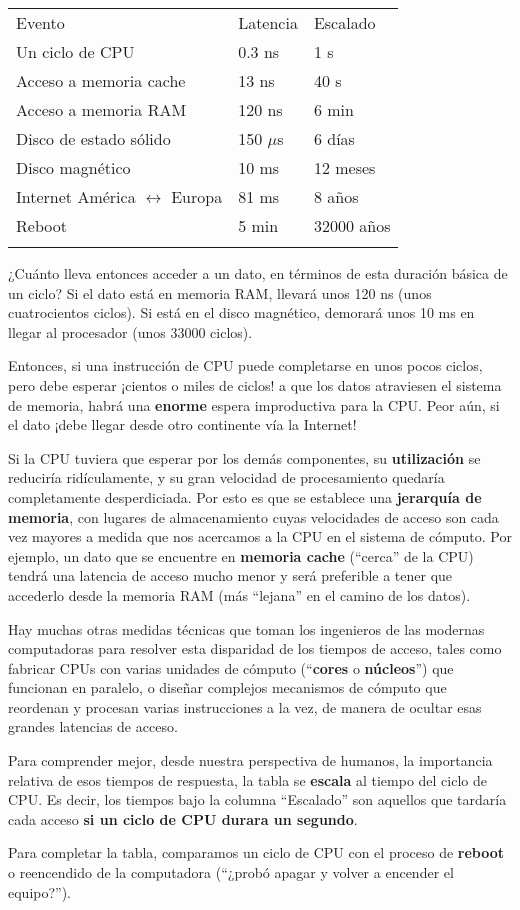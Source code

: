 \documentclass[spanish,A4,]{article}
\begin{document}
\begin{longtable}[c]{@{}lll@{}}
\toprule\addlinespace
Evento & Latencia & Escalado
\\\addlinespace
\midrule\endhead
Un ciclo de CPU & 0.3 ns & 1 s
\\\addlinespace
Acceso a memoria cache & 13 ns & 40 s
\\\addlinespace
Acceso a memoria RAM & 120 ns & 6 min
\\\addlinespace
Disco de estado sólido & 150 $\mu$s & 6 días
\\\addlinespace
Disco magnético & 10 ms & 12 meses
\\\addlinespace
Internet América $\longleftrightarrow$ Europa & 81 ms & 8 años
\\\addlinespace
Reboot & 5 min & 32000 años
\\\addlinespace
\bottomrule
\end{longtable}

¿Cuánto lleva entonces acceder a un dato, en términos de esta duración
básica de un ciclo? Si el dato está en memoria RAM, llevará unos 120 ns
(unos cuatrocientos ciclos). Si está en el disco magnético, demorará
unos 10 ms en llegar al procesador (unos 33000 ciclos).

Entonces, si una instrucción de CPU puede completarse en unos pocos
ciclos, pero debe esperar ¡cientos o miles de ciclos! a que los datos
atraviesen el sistema de memoria, habrá una \textbf{enorme} espera
improductiva para la CPU. Peor aún, si el dato ¡debe llegar desde otro
continente vía la Internet!

Si la CPU tuviera que esperar por los demás componentes, su
\textbf{utilización} se reduciría ridículamente, y su gran velocidad de
procesamiento quedaría completamente desperdiciada. Por esto es que se
establece una \textbf{jerarquía de memoria}, con lugares de
almacenamiento cuyas velocidades de acceso son cada vez mayores a medida
que nos acercamos a la CPU en el sistema de cómputo. Por ejemplo, un
dato que se encuentre en \textbf{memoria cache} (``cerca'' de la CPU)
tendrá una latencia de acceso mucho menor y será preferible a tener que
accederlo desde la memoria RAM (más ``lejana'' en el camino de los
datos).

Hay muchas otras medidas técnicas que toman los ingenieros de las
modernas computadoras para resolver esta disparidad de los tiempos de
acceso, tales como fabricar CPUs con varias unidades de cómputo
(``\textbf{cores} o \textbf{núcleos}'') que funcionan en paralelo, o
diseñar complejos mecanismos de cómputo que reordenan y procesan varias
instrucciones a la vez, de manera de ocultar esas grandes latencias de
acceso.

Para comprender mejor, desde nuestra perspectiva de humanos, la
importancia relativa de esos tiempos de respuesta, la tabla se
\textbf{escala} al tiempo del ciclo de CPU. Es decir, los tiempos bajo
la columna ``Escalado'' son aquellos que tardaría cada acceso \textbf{si
un ciclo de CPU durara un segundo}.

Para completar la tabla, comparamos un ciclo de CPU con el proceso de
\textbf{reboot} o reencendido de la computadora (``¿probó apagar y
volver a encender el equipo?'').
\end{document}
